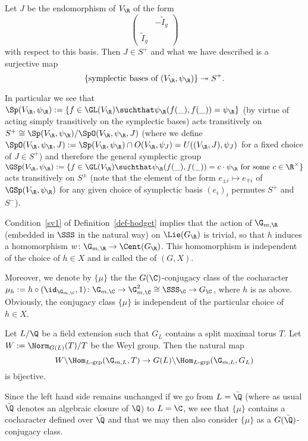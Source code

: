 \documentclass[a4paper]{scrartcl} %
\numberwithin{equation}{section}
\begin{document}
\begin{Example}
  Let $J$ be the endomorphism of $V_\R$ of the form
  \begin{equation*}
    \begin{pmatrix}
      & -\tilde{I}_g \\
      \tilde{I}_g &
    \end{pmatrix}
  \end{equation*}
  with respect to this basis. Then $J\in S^+$ and what we have described is a surjective map
  \begin{equation*}
    \{\text{symplectic bases of } (V_\R,\psi_\R)\} \twoheadrightarrow S^+.
  \end{equation*}

  In particular we see that $\Sp(V_\R,\psi_\R):=\{f\in\GL(V_\R) \suchthat \psi_\R(f(\_),f(\_))=\psi_\R\}$  (by virtue of acting simply transitively on the symplectic bases) acts transitively on $S^+\cong \Sp(V_\R,\psi_\R)/\SpO(V_\R,\psi_\R,J)$ (where we define $\SpO(V_\R,\psi_\R,J):=\Sp(V_\R,\psi_\R)\cap O(V_\R,\psi_J)=U((V_\R,J),\psi_J)$ for a fixed choice of $J\in S^+$) and therefore the general symplectic group $\GSp(V_\R,\psi_\R):=\{f\in\GL(V_\R) \suchthat \psi_\R(f(\_),f(\_))=c\cdot\psi_\R\text{ for some } c\in\R^\times\}$ acts transitively on $S^\pm$ (note that the element of the form $e_{\pm i}\mapsto e_{\mp i}$ of $\GSp(V_\R,\psi_\R)$ for any given choice of symplectic basis $\left(e_i\right)_i$ permutes $S^+$ and $S^-$).
\end{Example}

\begin{Definition}
  Condition~\eqref{sv1} of Definition~\ref{def-hodget} implies that the action of $\G_{m,\R}$ (embedded in $\SSS$ in the natural way) on $\Lie(G_\R)$ is trivial, so that $h$ induces a homomorphism ${w\colon \G_{m,\R}\to \Cent(G_\R)}$. This homomorphism is independent of the choice of $h\in X$ and is called the  of $(G,X)$.

  Moreover, we denote by $\{\mu\}$ the the $G(\C)$-conjugacy class of the cocharacter $\mu_h:=h\circ(\id_{\G_{m,\C}},1)\colon \G_{m,\C}\to \G_{m,\C}^2\cong\SSS_\C\to G_\C$, where $h$ is as above. Obviously, the conjugacy class $\{\mu\}$ is independent of the particular choice of $h\in X$.
\end{Definition}

\begin{Remark}\label{conj-class-cochar}
  Let $L/\Q$ be a field extension such that $G_L$ contains a split maximal torus $T$.  Let $W:=\Norm_{G(L)}(T)/T$ be the Weyl group.  Then the natural map
  \begin{equation*}
    W\backslash \Hom_{L\text{-grp}}(\G_{m,L},T) \to G(L)\backslash \Hom_{L\text{-grp}}(\G_{m,L},G_L)
  \end{equation*}
  is bijective.

  Since the left hand side remains unchanged if we go from $L=\bar\Q$ (where as usual $\bar\Q$ denotes an algebraic closure of $\Q$) to $L=\C$, we see that $\{\mu\}$ contains a cocharacter defined over $\bar\Q$ and that we may then also consider $\{\mu\}$ as a $G(\bar\Q)$-conjugacy class.
\end{Remark}
\end{document}
